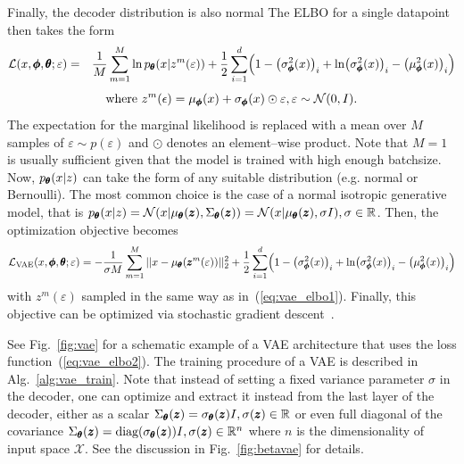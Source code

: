 Finally, the decoder distribution is also normal 
 The ELBO for a single datapoint then takes the form
\begin{eqnarray*}
\mathcal{L}(x,\vc{\phi},\vc{\theta};\varepsilon) & = & \frac{1}{M}\sum_{m=1}^{M}\ln p_{\vc{\theta}}(x|z^{m}(\varepsilon))+\frac{1}{2}\sum_{i=1}^{d}\left(1-\left(\sigma_{\vc{\phi}}^{2}(x)\right)_{i}+\ln\left(\sigma_{\vc{\phi}}^{2}(x)\right)_{i}-\left(\mu_{\vc{\phi}}^{2}(x)\right)_{i}\right)
\end{eqnarray*}
\begin{equation}
\text{where }z^{m}(\epsilon)=\mu_{\pmb{{\phi}}}(x)+\sigma_{\pmb{{\phi}}}(x)\odot\varepsilon,\varepsilon\sim\mathcal{N}(0,I).\label{eq:vae_elbo1}
\end{equation}
The expectation for the marginal likelihood is replaced with a mean
over $M$ samples of $\varepsilon\sim p(\varepsilon)$ and $\odot$
denotes an element--wise product. Note that $M=1$ is usually sufficient
given that the model is trained with high enough batchsize. Now, $p_{\pmb{{\theta}}}(x|z)$
can take the form of any suitable distribution (e.g. normal or Bernoulli).
The most common choice is the case of a normal isotropic generative
model, that is $p_{\pmb{{\theta}}}(x|z)=\mathcal{N}(x|\mu_{\pmb{{\theta}}}(\pmb{{z}}),\Sigma_{\pmb{{\theta}}}(\pmb{{z}}))=\mathcal{N}(x|\mu_{\pmb{{\theta}}}(\pmb{{z}}),\sigma I),\sigma\in\mathbb{R}$.
Then, the optimization objective becomes
\begin{equation}
\mathcal{L_{\text{VAE}}}(x,\vc{\phi},\vc{\theta};\varepsilon)=-\frac{1}{\sigma M}\sum_{m=1}^{M}||x-\mu_{\vc{\theta}}(\vc{z}^{m}(\varepsilon))||_{2}^{2}+\frac{1}{2}\sum_{i=1}^{d}\left(1-\left(\sigma_{\vc{\phi}}^{2}(x)\right)_{i}+\ln\left(\sigma_{\vc{\phi}}^{2}(x)\right)_{i}-\left(\mu_{\vc{\phi}}^{2}(x)\right)_{i}\right)\label{eq:vae_elbo2}
\end{equation}
with $z^{m}(\varepsilon)$ sampled in the same way as in~(\ref{eq:vae_elbo1}).
Finally, this objective can be optimized via stochastic gradient descent~\cite{bottou2010large}.

See Fig.~\ref{fig:vae} for a schematic example of a VAE architecture
that uses the loss function~(\ref{eq:vae_elbo2}). The training
procedure of a VAE is described in Alg.~\ref{alg:vae_train}. Note
that instead of setting a fixed variance parameter $\sigma$ in the
decoder, one can optimize and extract it instead from the last layer
of the decoder, either as a scalar $\Sigma_{\pmb{{\theta}}}(\pmb{{z}})=\sigma_{\pmb{{\theta}}}(\pmb{{z}})I,\sigma(\pmb{{z}})\in\mathbb{R}$
or even full diagonal of the covariance $\Sigma_{\vc{\theta}}(\vc{z})=\text{diag}\left(\sigma_{\vc{\theta}}(\vc{z})\right)I,\sigma(\vc{z})\in\mathbb{R}^{n}$
where $n$ is the dimensionality of input space $\mathcal{X}$. See
the discussion in Fig.~\ref{fig:betavae} for details.

